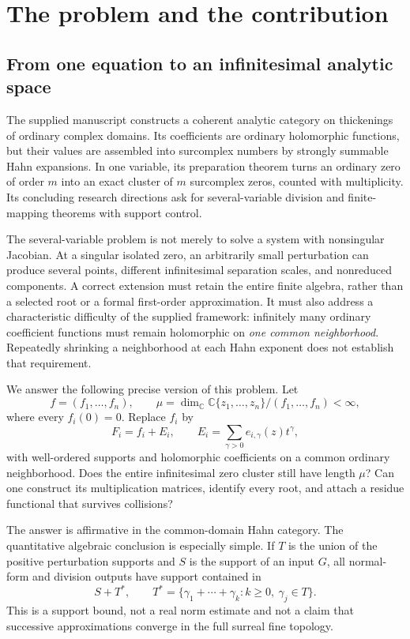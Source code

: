 \documentclass[11pt]{article}
\theoremstyle{definition}
\newcommand{\C}{\mathbb C}
\begin{document}
\section{The problem and the contribution}\label{sec:intro}
\subsection{From one equation to an infinitesimal analytic space}
The supplied manuscript \cite{Source} constructs a coherent analytic category on thickenings of ordinary complex domains. Its coefficients are ordinary holomorphic functions, but their values are assembled into surcomplex numbers by strongly summable Hahn expansions. In one variable, its preparation theorem turns an ordinary zero of order $m$ into an exact cluster of $m$ surcomplex zeros, counted with multiplicity. Its concluding research directions ask for several-variable division and finite-mapping theorems with support control.

The several-variable problem is not merely to solve a system with nonsingular Jacobian. At a singular isolated zero, an arbitrarily small perturbation can produce several points, different infinitesimal separation scales, and nonreduced components. A correct extension must retain the entire finite algebra, rather than a selected root or a formal first-order approximation. It must also address a characteristic difficulty of the supplied framework: infinitely many ordinary coefficient functions must remain holomorphic on \emph{one common neighborhood}. Repeatedly shrinking a neighborhood at each Hahn exponent does not establish that requirement.

We answer the following precise version of this problem. Let
\[
 f=(f_1,\ldots,f_n),\qquad
 \mu=\dim_\C\C\{z_1,\ldots,z_n\}/(f_1,\ldots,f_n)<\infty,
\]
where every $f_i(0)=0$. Replace $f_i$ by
\begin{equation}\label{eq:mainperturbation}
 F_i=f_i+E_i,\qquad
 E_i=\sum_{\gamma>0}e_{i,\gamma}(z)t^\gamma,
\end{equation}
with well-ordered supports and holomorphic coefficients on a common ordinary neighborhood. Does the entire infinitesimal zero cluster still have length $\mu$? Can one construct its multiplication matrices, identify every root, and attach a residue functional that survives collisions?

The answer is affirmative in the common-domain Hahn category. The quantitative algebraic conclusion is especially simple. If $T$ is the union of the positive perturbation supports and $S$ is the support of an input $G$, all normal-form and division outputs have support contained in
\begin{equation}\label{eq:masterbound}
 S+T^*,\qquad
 T^*=\{\gamma_1+\cdots+\gamma_k:k\geq0,\ \gamma_j\in T\}.
\end{equation}
This is a support bound, not a real norm estimate and not a claim that successive approximations converge in the full surreal fine topology.
\end{document}
